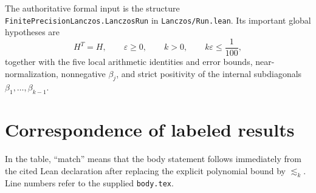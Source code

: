 \documentclass[11pt]{article}
\newcommand{\eps}{\varepsilon}
\newcommand{\lean}[1]{\nolinkurl{#1}}
\begin{document}
The authoritative formal input is the structure
\lean{FinitePrecisionLanczos.LanczosRun} in
\lean{Lanczos/Run.lean}.  Its important global hypotheses are
\[
  H^T=H,\qquad \eps\ge 0,\qquad k>0,\qquad k\eps\le \frac1{100},
\]
together with the five local arithmetic identities and error bounds,
near-normalization, nonnegative $\beta_j$, and strict positivity of the
internal subdiagonals $\beta_1,\ldots,\beta_{k-1}$.

\section*{Correspondence of labeled results}

In the table, ``match'' means that the body statement follows immediately
from the cited Lean declaration after replacing the explicit polynomial bound
by $\lesssim_k$.  Line numbers refer to the supplied \texttt{body.tex}.
\end{document}
